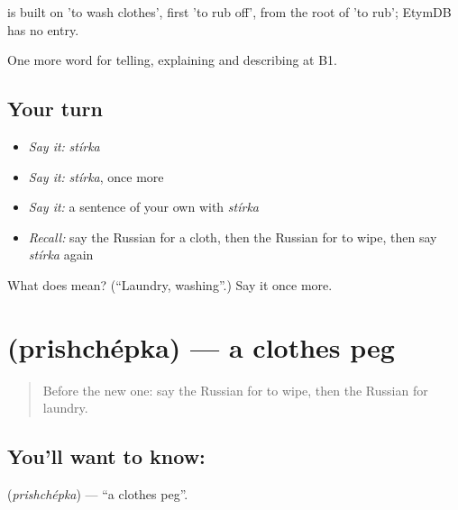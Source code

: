 \begin{cousinweb}
\emph{} is built on \emph{} 'to wash clothes', first 'to rub off', from the root of \emph{} 'to rub'; EtymDB has no entry.
\end{cousinweb}

\begin{grammarlens}[title={What you've built}]
One more word for telling, explaining and describing at B1.
\end{grammarlens}

\subsection*{Your turn}
\begin{itemize}
\raggedright
  \item \emph{Say it:} \emph{stírka}
  \item \emph{Say it:} \emph{stírka}, once more
  \item \emph{Say it:} a sentence of your own with \emph{stírka}
  \item \emph{Recall:} say the Russian for a cloth, then the Russian for to wipe, then say \emph{stírka} again
\end{itemize}

\begin{tcolorbox}[breakable,colback=teal!4,colframe=teal!35!black,title={Before you move on}]
What does  mean? (\textquotedblleft{}Laundry, washing\textquotedblright{}.) Say it once more.
\end{tcolorbox}
\section[\texorpdfstring{\ru{прищепка} (prishchépka)}{прищепка (prishchépka)}]{ (prishchépka) — a clothes peg}

\label{lesson:RU-C530-prishchepka}



\begin{quote}
Before the new one: say the Russian for to wipe, then the Russian for laundry.
\end{quote}

\subsection*{You'll want to know: }
\textbf{} (\emph{prishchépka}) — \textquotedblleft{}a clothes peg\textquotedblright{}.

